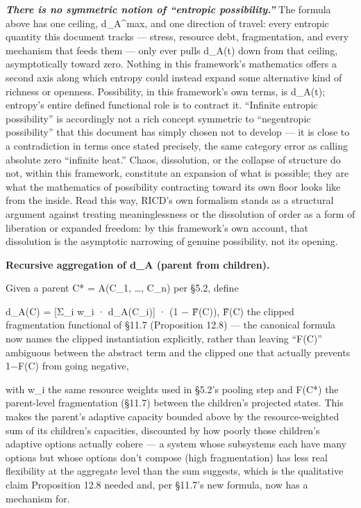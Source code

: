 \documentclass[
]{article}
\begin{document}
\emph{\textbf{There is no symmetric notion of ``entropic
possibility.''}} The formula above has one ceiling, d\_A\^{}max, and one
direction of travel: every entropic quantity this document tracks ---
stress, resource debt, fragmentation, and every mechanism that feeds
them --- only ever pulls d\_A(t) down from that ceiling, asymptotically
toward zero. Nothing in this framework's mathematics offers a second
axis along which entropy could instead expand some alternative kind of
richness or openness. Possibility, in this framework's own terms, is
d\_A(t); entropy's entire defined functional role is to contract it.
``Infinite entropic possibility'' is accordingly not a rich concept
symmetric to ``negentropic possibility'' that this document has simply
chosen not to develop --- it is close to a contradiction in terms once
stated precisely, the same category error as calling absolute zero
``infinite heat.'' Chaos, dissolution, or the collapse of structure do
not, within this framework, constitute an expansion of what is possible;
they are what the mathematics of possibility contracting toward its own
floor looks like from the inside. Read this way, RICD's own formalism
stands as a structural argument against treating meaninglessness or the
dissolution of order as a form of liberation or expanded freedom: by
this framework's own account, that dissolution is the asymptotic
narrowing of genuine possibility, not its opening.

\textbf{Recursive aggregation of d\_A (parent from children).}

Given a parent C* = A(C\_1, \ldots, C\_n) per §5.2, define

d\_A(C) = {[}Σ\_i w\_i · d\_A(C\_i){]} · (1 − F̃(C)), F̃(C) the clipped
fragmentation functional of §11.7 (Proposition 12.8) --- the canonical
formula now names the clipped instantiation explicitly, rather than
leaving ``F(C)'' ambiguous between the abstract term and the clipped one
that actually prevents 1−F(C) from going negative,

with w\_i the same resource weights used in §5.2's pooling step and
F(C*) the parent-level fragmentation (§11.7) between the children's
projected states. This makes the parent's adaptive capacity bounded
above by the resource-weighted sum of its children's capacities,
discounted by how poorly those children's adaptive options actually
cohere --- a system whose subsystems each have many options but whose
options don't compose (high fragmentation) has less real flexibility at
the aggregate level than the sum suggests, which is the qualitative
claim Proposition 12.8 needed and, per §11.7's new formula, now has a
mechanism for.
\end{document}

